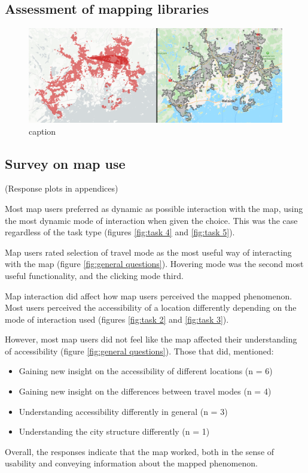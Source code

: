 


\subsection{Assessment of mapping libraries}



\begin{figure}[H]
	\centering
	\includegraphics[width=\textwidth]{visual/figures/screenshots/bug.png}
	\caption{caption \parencite{deckbug}}
	\label{fig:bug}
\end{figure}

\subsection{Survey on map use}

(Response plots in appendices)

Most map users preferred as dynamic as possible interaction with the map,
using the most dynamic mode of interaction when given the choice.
This was the case regardless of the task type (figures \ref{fig:task 4} and \ref{fig:task 5}).

Map users rated selection of travel mode as the most useful way of
interacting with the map (figure \ref{fig:general questions}).
Hovering mode was the second most useful functionality,
and the clicking mode third.

Map interaction did affect how map users perceived the mapped phenomenon.
Most users perceived the accessibility of a location differently depending
on the mode of interaction used (figures \ref{fig:task 2} and \ref{fig:task 3}).

However, most map users did not feel like the map affected
their understanding of accessibility (figure \ref{fig:general questions}).
Those that did, mentioned:

\begin{itemize}
	\item Gaining new insight on the accessibility of different locations (n = 6)
	\item Gaining new insight on the differences between travel modes (n = 4)
	\item Understanding accessibility differently in general (n = 3)
	\item Understanding the city structure differently (n = 1)
\end{itemize}

Overall, the responses indicate that the map worked,
both in the sense of usability and conveying information about the mapped phenomenon.

